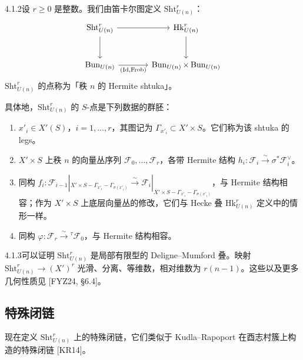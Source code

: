 \begin{defn}{4.1.2}设 $r\ge0$ 是整数。我们由笛卡尔图定义 $\mathrm{Sht}^r_{U(n)}$：
\[
\begin{tikzcd}[column sep=large, row sep=large]
\mathrm{Sht}^r_{U(n)} \arrow[r] \arrow[d] & \mathrm{Hk}^r_{U(n)} \arrow[d] \\
\Bun_{U(n)} \arrow[r, "{(\mathrm{Id},\mathrm{Frob})}"'] & \Bun_{U(n)}\times\Bun_{U(n)}
\end{tikzcd}
\]
$\mathrm{Sht}^r_{U(n)}$ 的点称为「秩 $n$ 的 Hermite shtuka」。

具体地，$\mathrm{Sht}^r_{U(n)}$ 的 $S$-点是下列数据的群胚：
\begin{enumerate}
\item $x'_i\in X'(S)$，$i=1,\dots,r$，其图记为 $\Gamma_{x'_i}\subset X'\times S$。它们称为该 shtuka 的 legs。
\item $X'\times S$ 上秩 $n$ 的向量丛序列 $\mathcal F_0,\dots,\mathcal F_r$，各带 Hermite 结构 $h_i\colon\mathcal F_i\xrightarrow{\sim}\sigma^*\mathcal F_i^\vee$。
\item 同构 $f_i\colon\mathcal F_{i-1}|_{X'\times S-\Gamma_{x'_i}-\Gamma_{\sigma(x'_i)}}\xrightarrow{\sim}\mathcal F_i|_{X'\times S-\Gamma_{x'_i}-\Gamma_{\sigma(x'_i)}}$，与 Hermite 结构相容；作为 $X'\times S$ 上底层向量丛的修改，它们与 Hecke 叠 $\mathrm{Hk}^r_{U(n)}$ 定义中的情形一样。
\item 同构 $\varphi\colon\mathcal F_r\xrightarrow{\sim}{}^\tau\mathcal F_0$，与 Hermite 结构相容。
\end{enumerate}
\end{defn}

\begin{rem}{4.1.3}可以证明 $\mathrm{Sht}^r_{U(n)}$ 是局部有限型的 Deligne–Mumford 叠。映射 $\mathrm{Sht}^r_{U(n)}\to(X')^r$ 光滑、分离、等维数，相对维数为 $r(n-1)$。这些以及更多几何性质见 [FYZ24, §6.4]。
\end{rem}

\subsection{特殊闭链}

现在定义 $\mathrm{Sht}^r_{U(n)}$ 上的特殊闭链，它们类似于 Kudla–Rapoport 在酉志村簇上构造的特殊闭链 [KR14]。

